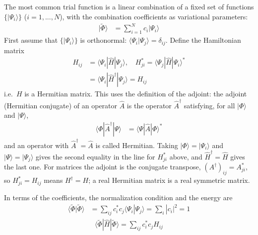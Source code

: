 The most common trial function is a linear combination of a fixed set of functions $\{|\Psi_i\rangle\}$ ($i = 1, ..., N$), with the combination coefficients as variational parameters:
\begin{align*}
|\tilde{\Phi}\rangle &= \sum_{i=1}^N c_i |\Psi_i\rangle
\end{align*}
First assume that $\{|\Psi_i\rangle\}$ is orthonormal: $\langle\Psi_i|\Psi_j\rangle = \delta_{ij}$. Define the Hamiltonian matrix
\begin{align*}
H_{ij} &= \langle \Psi_i|\hat{H}|\Psi_j\rangle, \quad H_{ji}^* = \langle \Psi_j|\hat{H}|\Psi_i\rangle^* \\
&= \langle \Psi_i|\hat{H}^\dagger|\Psi_j\rangle = H_{ij}
\end{align*}
i.e.\ $H$ is a Hermitian matrix. This uses the definition of the adjoint: the adjoint (Hermitian conjugate) of an operator $\hat{A}$ is the operator $\hat{A}^\dagger$ satisfying, for all $|\Phi\rangle$ and $|\Psi\rangle$,
\begin{align*}
\langle\Phi|\hat{A}^\dagger|\Psi\rangle &= \langle\Psi|\hat{A}|\Phi\rangle^*
\end{align*}
and an operator with $\hat{A}^\dagger = \hat{A}$ is called Hermitian. Taking $|\Phi\rangle = |\Psi_i\rangle$ and $|\Psi\rangle = |\Psi_j\rangle$ gives the second equality in the line for $H_{ji}^*$ above, and $\hat{H}^\dagger = \hat{H}$ gives the last one. For matrices the adjoint is the conjugate transpose, $(A^\dagger)_{ij} = A_{ji}^*$, so $H_{ji}^* = H_{ij}$ means $H^\dagger = H$; a real Hermitian matrix is a real symmetric matrix.

In terms of the coefficients, the normalization condition and the energy are
\begin{align*}
\langle\tilde{\Phi}|\tilde{\Phi}\rangle &= \sum_{ij} c_i^* c_j \langle\Psi_i|\Psi_j\rangle = \sum_i |c_i|^2 = 1
\end{align*}
\begin{align*}
\langle\tilde{\Phi}|\hat{H}|\tilde{\Phi}\rangle = \sum_{ij} c_i^* c_j H_{ij}
\end{align*}

